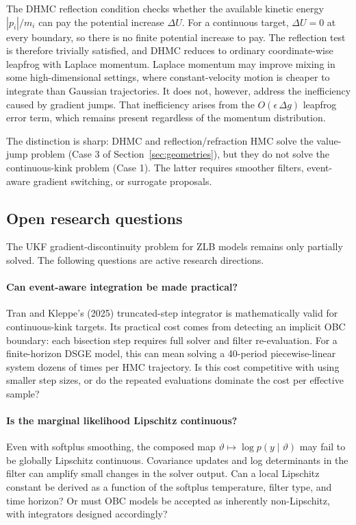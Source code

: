 \documentclass[11pt]{article}
\begin{document}
The DHMC reflection condition checks whether the available kinetic energy $|p_i|/m_i$ can pay the potential increase $\Delta U$. For a continuous target, $\Delta U = 0$ at every boundary, so there is no finite potential increase to pay. The reflection test is therefore trivially satisfied, and DHMC reduces to ordinary coordinate-wise leapfrog with Laplace momentum. Laplace momentum may improve mixing in some high-dimensional settings, where constant-velocity motion is cheaper to integrate than Gaussian trajectories. It does not, however, address the inefficiency caused by gradient jumps. That inefficiency arises from the $O(\epsilon\,\Delta g)$ leapfrog error term, which remains present regardless of the momentum distribution.

The distinction is sharp: DHMC and reflection/refraction HMC solve the value-jump problem (Case 3 of Section~\ref{sec:geometries}), but they do not solve the continuous-kink problem (Case 1). The latter requires smoother filters, event-aware gradient switching, or surrogate proposals.

\subsection{Open research questions}\label{sec:ukf-open}

The UKF gradient-discontinuity problem for ZLB models remains only partially solved. The following questions are active research directions.

\paragraph{Can event-aware integration be made practical?}
Tran and Kleppe's (2025) truncated-step integrator is mathematically valid for continuous-kink targets. Its practical cost comes from detecting an implicit OBC boundary: each bisection step requires full solver and filter re-evaluation. For a finite-horizon DSGE model, this can mean solving a 40-period piecewise-linear system dozens of times per HMC trajectory. Is this cost competitive with using smaller step sizes, or do the repeated evaluations dominate the cost per effective sample?

\paragraph{Is the marginal likelihood Lipschitz continuous?}
Even with softplus smoothing, the composed map $\vartheta\mapsto\log p(y\mid\vartheta)$ may fail to be globally Lipschitz continuous. Covariance updates and log determinants in the filter can amplify small changes in the solver output. Can a local Lipschitz constant be derived as a function of the softplus temperature, filter type, and time horizon? Or must OBC models be accepted as inherently non-Lipschitz, with integrators designed accordingly?
\end{document}

